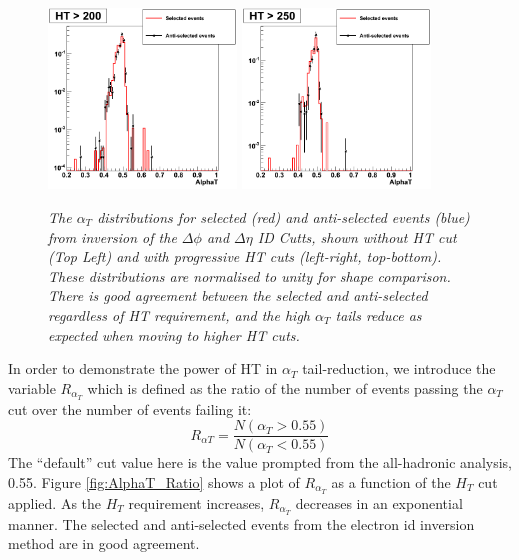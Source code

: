 \documentclass{article}
\begin{document}
\begin{figure}[h!]
\hspace*{3mm}
\includegraphics[width=50mm]{alphat_5.png}
\hspace*{2mm}
\includegraphics[width=50mm]{alphat_6.png}
\caption{\textit{The $\alpha_{T}$ distributions for selected (red) and anti-selected events (blue) from inversion of the $\Delta \phi$ and $\Delta \eta$ ID Cutts, shown without HT cut (Top Left) and with progressive HT cuts (left-right, top-bottom). These distributions are normalised to unity for shape comparison. There is good agreement between the selected and anti-selected regardless of HT requirement, and the high $\alpha_{T}$ tails reduce as expected when moving to higher HT cuts.}}
\label{fig:AlphaTbyHT}
\end{figure}

In order to demonstrate the power of HT in $\alpha_{T}$ tail-reduction, we introduce the variable $R_{\alpha_T}$ which is defined as the ratio of the number of events passing the $\alpha_T$ cut over the number of events failing it:
\begin{equation}
R_{\alpha T} = \frac{N(\alpha_{T}>0.55)}{N(\alpha_{T}<0.55)}
\end{equation}
The ``default'' cut value here is the value prompted from the all-hadronic analysis, 0.55. Figure \ref{fig:AlphaT_Ratio} shows a plot of $R_{\alpha_T}$ as a function of the $H_{T}$ cut applied. As the $H_{T}$ requirement increases, $R_{\alpha_T}$ decreases in an exponential manner. The selected and anti-selected events from the electron id inversion method are in good agreement.
\end{document}
